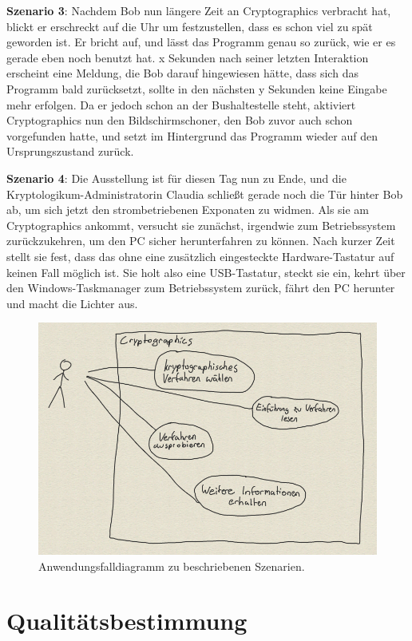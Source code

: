 \documentclass{article}
\begin{document}
\textbf{Szenario 3}:
Nachdem Bob nun längere Zeit an Cryptographics verbracht hat, blickt er erschreckt auf die Uhr um festzustellen, dass es schon viel zu spät geworden ist. Er bricht auf, und lässt das Programm genau so zurück, wie er es gerade eben noch benutzt hat. x Sekunden nach seiner letzten Interaktion erscheint eine Meldung, die Bob darauf hingewiesen hätte, dass sich das Programm bald zurücksetzt, sollte in den nächsten y Sekunden keine Eingabe mehr erfolgen. Da er jedoch schon an der Bushaltestelle steht, aktiviert Cryptographics nun den Bildschirmschoner, den Bob zuvor auch schon vorgefunden hatte, und setzt im Hintergrund das Programm wieder auf den Ursprungszustand zurück.

\textbf{Szenario 4}:
Die Ausstellung ist für diesen Tag nun zu Ende, und die Kryptologikum-Administratorin Claudia schließt gerade noch die Tür hinter Bob ab, um sich jetzt den strombetriebenen Exponaten zu widmen. Als sie am Cryptographics ankommt, versucht sie zunächst, irgendwie zum Betriebssystem zurückzukehren, um den PC sicher herunterfahren zu können. Nach kurzer Zeit stellt sie fest, dass das ohne eine zusätzlich eingesteckte Hardware-Tastatur auf keinen Fall möglich ist. Sie holt also eine USB-Tastatur, steckt sie ein, kehrt über den Windows-Taskmanager zum Betriebssystem zurück, fährt den PC herunter und macht die Lichter aus.

\begin{figure}[h!]
  \centering
    \includegraphics[width=\textwidth]{usecase1.PNG}
  \caption{Anwendungsfalldiagramm zu beschriebenen Szenarien.}
\end{figure}

\section{Qualitätsbestimmung}
\end{document}
